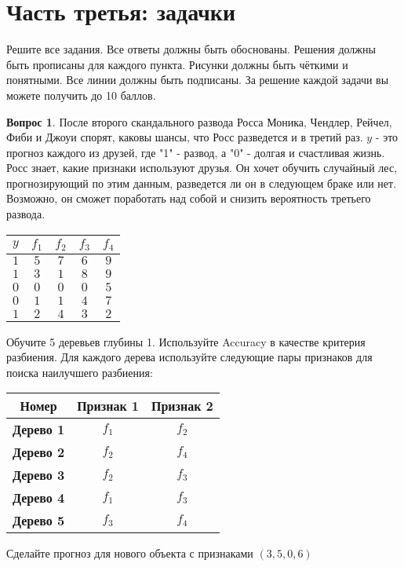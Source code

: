 \documentclass[12pt]{article}
\theoremstyle{definition}
\newtheorem{question}{Вопрос}
\begin{document}
\newpage 



\section*{Часть третья: задачки}

Решите все задания. Все ответы должны быть обоснованы. Решения должны быть прописаны для каждого пункта. Рисунки должны быть чёткими и понятными. Все линии должны быть подписаны. За решение каждой задачи вы можете получить до 10 баллов.
\begin{question}
После второго скандального развода Росса Моника, Чендлер, Рейчел, Фиби и Джоуи спорят, каковы шансы, что Росс разведется и в третий раз. 
$y$ - это прогноз каждого из друзей, где "1" - развод, а "0" - долгая и счастливая жизнь. Росс знает, какие признаки используют друзья. Он хочет обучить случайный лес, прогнозирующий по этим данным, разведется ли он в следующем браке или нет. Возможно, он сможет поработать над собой и снизить вероятность третьего развода.

\begin{center}
    \begin{tabular}{ccccc}
        \toprule
        $y$ & $f_1$ & $f_2$ & $f_3$ & $f_4$ \\
        \midrule
        $1$ & $5$ & $7$ & $6$ & $9$\\
        $1$ & $3$ & $1$ & $8$ & $9$\\
        $0$ & $0$ & $0$ & $0$ & $5$\\
        $0$ & $1$ & $1$ & $4$ & $7$\\
        $1$ & $2$ & $4$ & $3$ & $2$\\
        \bottomrule
    \end{tabular}
\end{center}


Обучите 5 деревьев глубины 1. Используйте Accuracy в качестве критерия разбиения.
Для каждого дерева используйте следующие пары признаков для поиска наилучшего разбиения:

\begin{table}[h]
    \centering
    \begin{tabular}{>{\bfseries}ccc}
        \toprule
        Номер & Признак 1 & Признак 2 \\ \midrule
         Дерево 1 & $f_1$ & $f_2$\\ 
         Дерево 2 & $f_2$ & $f_4$\\ 
         Дерево 3 & $f_2$ & $f_3$\\
         Дерево 4 & $f_1$ & $f_3$\\ 
         Дерево 5 & $f_3$ & $f_4$\\ 
    \end{tabular}
\end{table}

Сделайте прогноз для нового объекта с признаками $(3, 5, 0, 6)$


\end{question}
\end{document}
